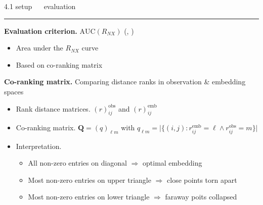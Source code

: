 \documentclass[11pt, compress, t, notes = noshow, xcolor = table, 
aspectratio = 1610]{beamer}
\newcommand{\highlight}[1]{\textcolor{highlightcol}{\textbf{#1}}}
\newcommand{\arritem}{\item[\highlight{$\rightarrow$}]}
\newcommand{\flexitem}[1]{\item[$\highlight{#1}$]}
\begin{document}
\LARGE
\begin{frame}{\textcolor{gray!90}{4.1 setup} ~~ evaluation}
\normalsize
\vspace{-0.5cm}
\noindent \textcolor{gray!90}{\rule{\textwidth}{1pt}}
\smallskip

\textbf{Evaluation criterion.} $\text{AUC}(R_{NX})$ 
(\citet{kraemeretal2019}, \citet{lueksetal2011})

\begin{itemize}
  \arritem Area under the $R_{NX}$ curve
  \arritem Based on co-ranking matrix
\end{itemize}

\vspace{0.3cm}

\textbf{Co-ranking matrix.} Comparing distance ranks in observation \& embedding 
spaces

\begin{itemize}
  \arritem Rank distance matrices. $(r)_{ij}^{\text{obs}}$ and
  $(r)_{ij}^{\text{emb}}$
  \arritem Co-ranking matrix. $\bm{Q} = (q)_{\ell m}$ with $q_{\ell m} = 
  \rvert \{ (i, j): 
  r_{ij}^{\text{emb}} = \ell \land r_{ij}^{\text{obs}} = m \} 
  \rvert$ 
  \arritem Interpretation.
  \begin{itemize}
    \flexitem{1} All non-zero entries on diagonal $\Rightarrow$ optimal 
    embedding
    \flexitem{2} Most non-zero entries on upper triangle $\Rightarrow$ close 
    points torn apart
    \flexitem{3} Most non-zero entries on lower triangle $\Rightarrow$ faraway 
    poits collapsed
  \end{itemize}
\end{itemize}

\end{frame}

\end{document}
